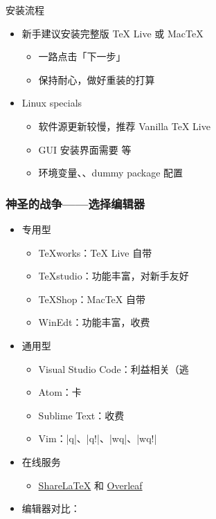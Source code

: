 \begin{frame}{安装流程}
\begin{itemize}
  \item 新手建议安装完整版 \TeX{} Live 或 Mac\TeX{}
    \begin{itemize}
      \item 一路点击「下一步」
      \item 保持耐心，做好重装的打算
    \end{itemize}
  \item Linux specials
    \begin{itemize}
      \item 软件源更新较慢，推荐 Vanilla \TeX{} Live
      \item GUI 安装界面需要  等
      \item 环境变量、、dummy package 配置
    \end{itemize}
\end{itemize}
\end{frame}

\begin{frame}[fragile]
\frametitle{神圣的战争——选择编辑器}
\begin{itemize}
  \item 专用型
    \begin{itemize}
      \item TeXworks：\TeX{} Live 自带 \faWindows{} \faApple{} \faLinux{}
      \item TeXstudio：功能丰富，对新手友好 \faWindows{} \faApple{} \faLinux{}
      \item TeXShop：Mac\TeX{} 自带 \faApple{}
      \item WinEdt：功能丰富，收费 \faWindows{}
    \end{itemize}
  \item 通用型
    \begin{itemize}
      \item Visual Studio Code：利益相关（逃
      \item Atom：卡
      \item Sublime Text：收费
      \item Vim：|q|、|q!|、|wq|、|wq!|
    \end{itemize}
  \item 在线服务
    \begin{itemize}
      \item \href{https://www.sharelatex.com}{\textcolor{酡红}{ShareLaTeX}} 和
            \href{https://www.overleaf.com}{\textcolor{松花绿}{Overleaf}}
    \end{itemize}
  \item 编辑器对比：
\end{itemize}
\end{frame}
